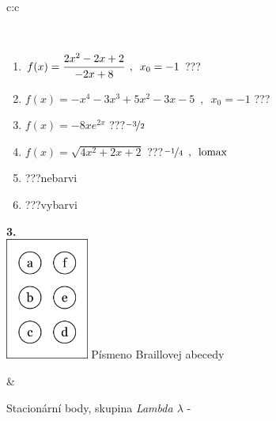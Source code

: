 \documentclass[10pt]{report}
\begin{document}
\begin{tabular}{c:c}
\begin{minipage}[c][104.5mm][t]{0.5\linewidth}
\begin{center}
\begin{minipage}{0.95\linewidth}
\begin{center}
\end{center}
\end{minipage}
\\[1mm]
\begin{minipage}{0.79\linewidth}
\begin{center}
\begin{varwidth}{\linewidth}
\begin{enumerate}
\normalsize
\item $f(x)=\cfrac{2x^2-2x+2}{-2x+8}\enspace , \enspace x_0=-1$\quad \dotfill\; ???\;\dotfill \quad {}
\item $f(x)=-x^4-3x^3+5x^2-3x-5\enspace , \enspace x_0=-1$\quad \dotfill\; ???\;\dotfill \quad {}
\item $f(x)=-8xe^{2x}$\quad \dotfill\; ???\;\dotfill \quad $\nicefrac{-3}{2}$
\item $f(x)=\sqrt{4x^2+2x+2}$\quad \dotfill\; ???\;\dotfill \quad $\nicefrac{-1}{4}\enspace , \enspace\mathrm{lomax}$
\item \quad \dotfill\; ???\;\dotfill \quad nebarvi
\item \quad \dotfill\; ???\;\dotfill \quad vybarvi
\end{enumerate}
\end{varwidth}
\end{center}
\end{minipage}
\begin{minipage}{0.20\linewidth}
\begin{center}
{\Huge\bfseries 3.} \\[2mm]
\includegraphics[height=40mm]{../images/braille.png}
{\small Písmeno Braillovej abecedy}
\end{center}
\end{minipage}
\end{center}
\end{minipage}
&
\begin{minipage}[c][104.5mm][t]{0.5\linewidth}
\begin{center}
\vspace{7mm}
{\huge Stacionární body, skupina \textit{Lambda $\lambda$} -}\\[5mm]

\end{center}
\end{minipage}
\end{tabular}
\end{document}
